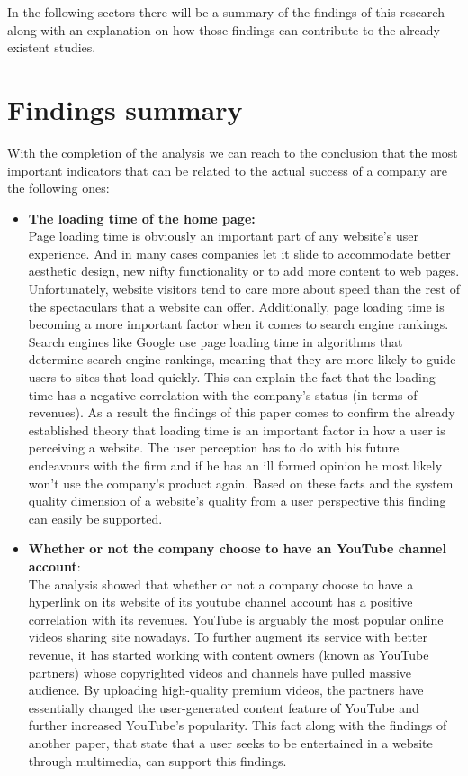 \documentclass{book}
\begin{document}
In the following sectors there will be a summary of the findings of this research along with an explanation on how those findings can contribute to the already existent studies.
\section{Findings summary}
With the completion of the analysis we can reach to the conclusion that the most important indicators that can be related to the actual success of a company are the following ones:
\begin{itemize}
\item  \textbf{The loading time of the home page:} \\
Page loading time is obviously an important part of any website's user experience. And in many cases companies let it slide to accommodate better aesthetic design, new nifty functionality or to add more content to web pages. Unfortunately, website visitors tend to care more about speed than the rest of the spectaculars that a website can offer. Additionally, page loading time is becoming a more important factor when it comes to search engine rankings.\\
Search engines like Google use page loading time in algorithms that determine search engine rankings, meaning that they are more likely to guide users to sites that load quickly. This can explain the fact that the loading time has a negative correlation with the company's status (in terms of revenues). As a result the findings of this paper comes to confirm the already established theory that loading time is an important factor in how a user is perceiving a website. The user perception has to do with his future endeavours with the firm and if he has an ill formed opinion he most likely won't use the company's product again. Based on these facts and the system quality dimension of a website's quality from a user perspective this finding can easily be supported.
\item \textbf{ Whether or not the company choose to have an YouTube channel account}: \\
The analysis showed that whether or not a company choose to have a hyperlink on its website of its youtube channel account has a positive correlation with its revenues. YouTube is arguably the most popular online videos sharing site nowadays. To further augment its service with better revenue, it has started working with content owners (known as YouTube partners) whose copyrighted videos and channels have pulled massive audience. By uploading high-quality premium videos, the partners have essentially changed the user-generated content feature of YouTube and further increased YouTube's popularity.\cite{key89} This fact along with the findings of another paper\cite{key12}, that state that a user seeks to be entertained in a website through multimedia, can support this findings.

\end{itemize}
\end{document}
